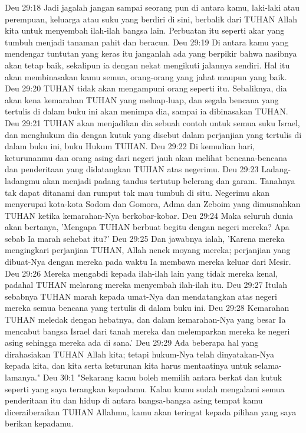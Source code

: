 Deu 29:18  Jadi jagalah jangan sampai seorang pun di antara kamu, laki-laki atau perempuan, keluarga atau suku yang berdiri di sini, berbalik dari TUHAN Allah kita untuk menyembah ilah-ilah bangsa lain. Perbuatan itu seperti akar yang tumbuh menjadi tanaman pahit dan beracun.
Deu 29:19  Di antara kamu yang mendengar tuntutan yang keras itu janganlah ada yang berpikir bahwa nasibnya akan tetap baik, sekalipun ia dengan nekat mengikuti jalannya sendiri. Hal itu akan membinasakan kamu semua, orang-orang yang jahat maupun yang baik.
Deu 29:20  TUHAN tidak akan mengampuni orang seperti itu. Sebaliknya, dia akan kena kemarahan TUHAN yang meluap-luap, dan segala bencana yang tertulis di dalam buku ini akan menimpa dia, sampai ia dibinasakan TUHAN.
Deu 29:21  TUHAN akan menjadikan dia sebuah contoh untuk semua suku Israel, dan menghukum dia dengan kutuk yang disebut dalam perjanjian yang tertulis di dalam buku ini, buku Hukum TUHAN.
Deu 29:22  Di kemudian hari, keturunanmu dan orang asing dari negeri jauh akan melihat bencana-bencana dan penderitaan yang didatangkan TUHAN atas negerimu.
Deu 29:23  Ladang-ladangmu akan menjadi padang tandus tertutup belerang dan garam. Tanahnya tak dapat ditanami dan rumput tak mau tumbuh di situ. Negerimu akan menyerupai kota-kota Sodom dan Gomora, Adma dan Zeboim yang dimusnahkan TUHAN ketika kemarahan-Nya berkobar-kobar.
Deu 29:24  Maka seluruh dunia akan bertanya, 'Mengapa TUHAN berbuat begitu dengan negeri mereka? Apa sebab Ia marah sehebat itu?'
Deu 29:25  Dan jawabnya ialah, 'Karena mereka mengingkari perjanjian TUHAN, Allah nenek moyang mereka; perjanjian yang dibuat-Nya dengan mereka pada waktu Ia membawa mereka keluar dari Mesir.
Deu 29:26  Mereka mengabdi kepada ilah-ilah lain yang tidak mereka kenal, padahal TUHAN melarang mereka menyembah ilah-ilah itu.
Deu 29:27  Itulah sebabnya TUHAN marah kepada umat-Nya dan mendatangkan atas negeri mereka semua bencana yang tertulis di dalam buku ini.
Deu 29:28  Kemarahan TUHAN meledak dengan hebatnya, dan dalam kemarahan-Nya yang besar Ia mencabut bangsa Israel dari tanah mereka dan melemparkan mereka ke negeri asing sehingga mereka ada di sana.'
Deu 29:29  Ada beberapa hal yang dirahasiakan TUHAN Allah kita; tetapi hukum-Nya telah dinyatakan-Nya kepada kita, dan kita serta keturunan kita harus mentaatinya untuk selama-lamanya."
Deu 30:1  "Sekarang kamu boleh memilih antara berkat dan kutuk seperti yang saya terangkan kepadamu. Kalau kamu sudah mengalami semua penderitaan itu dan hidup di antara bangsa-bangsa asing tempat kamu diceraiberaikan TUHAN Allahmu, kamu akan teringat kepada pilihan yang saya berikan kepadamu.
